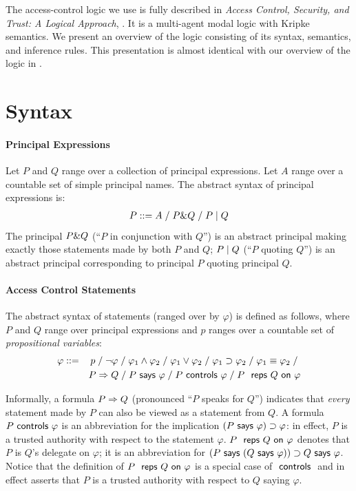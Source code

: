 The access-control logic we use is fully described in \emph{Access
  Control, Security, and Trust: A Logical Approach}, \cite{ACST}. It
is a multi-agent modal logic with Kripke semantics.  We present an
overview of the logic consisting of its syntax, semantics, and
inference rules. This presentation is almost identical with our
overview of the logic in \cite{DBLP:conf/mmmacns/ChinMOV10}.

\section{Syntax}
\label{sec:syntax}

\paragraph{Principal Expressions}

Let $P$ and $Q$ range over a collection of principal expressions. Let
$A$ range over a countable set of simple principal names. The abstract
syntax of principal expressions is:
\begin{align*}
P ::= A \;/\; P \& Q \;/\; P\mid Q 
\end{align*}
The principal $P \& Q$ (``$P$ in conjunction with $Q$'') is an
abstract principal making exactly those statements made by both $P$
and $Q$; $P\mid Q$ (``$P$ quoting $Q$'') is an abstract
principal corresponding to principal $P$ quoting principal $Q$.

\paragraph{Access Control Statements}

The abstract syntax of statements (ranged over by $\varphi$) is
defined as follows, where $P$ and $Q$ range over principal expressions
and $p$ ranges over a countable set of
\emph{propositional variables}:
\begin{eqnarray*}
  \varphi &::=&  p \;/\;  \neg \varphi 
  \;/\;  \varphi_1 \wedge \varphi_2
  \;/\;  \varphi_1 \vee \varphi_2
  \;/\;  \varphi_1 \supset \varphi_2 \;/\; \varphi_1 \equiv \varphi_2 \;/\;\\
  & &  P \Rightarrow Q 
  \;/\; P \textsf{ says } \varphi 
  \;/\; P \textsf{ controls } \varphi
  \;/\; {P} {\text{ \textsf{ reps }}}{Q}{\text{\textsf{ on }}}{\varphi}
\end{eqnarray*}

Informally, a formula $P \Rightarrow Q$ (pronounced ``$P$ speaks for
$Q$'') indicates that \emph{every} statement made by $P$ can also be
viewed as a statement from $Q$.  A formula $P \textsf{ controls } \varphi$ is an
abbreviation for the implication $(P \textsf{ says } \varphi) \supset \varphi$:
in effect, $P$ is a trusted authority with respect to the statement
$\varphi$. ${P} {\text{ \textsf{ reps }}}{Q}{\text{\textsf{ on }}}{\varphi}$ denotes that $P$ is $Q$'s delegate
on $\varphi$; it is an abbreviation for $(P \textsf{ says } (Q \textsf{ says } \varphi))
\supset Q \textsf{ says } \varphi$. Notice that the definition of
${P} {\text{ \textsf{ reps }}}{Q}{\text{\textsf{ on }}}{\varphi}$ is a special case of $\textsf{ controls }$ and in effect
asserts that $P$ is a trusted authority with respect to $Q$ saying
$\varphi$.

